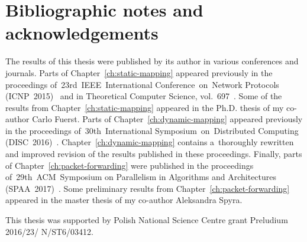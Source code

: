 \section{Bibliographic notes and acknowledgements}

The results of this thesis were published by its author in various conferences and journals.
Parts of Chapter~\ref{ch:static-mapping} appeared previously in the proceedings of~23rd~IEEE~International Conference~on~Network Protocols (ICNP~2015)~\cite{my-icnp}
and in Theoretical Computer Science, vol.~697~\cite{my-tcs}.
Some of the results from Chapter~\ref{ch:static-mapping} appeared in the Ph.D. thesis of my co-author Carlo Fuerst.
Parts of Chapter~\ref{ch:dynamic-mapping} appeared previously in the proceedings of~30th~International Symposium~on~Distributed Computing (DISC~2016)~\cite{my-disc}.
Chapter~\ref{ch:dynamic-mapping} contains a~thoroughly rewritten and improved revision of the results published in these proceedings.
Finally, parts of Chapter~\ref{ch:packet-forwarding} were published in the proceedings of~29th~ACM~Symposium on Parallelism in Algorithms and Architectures (SPAA~2017)~\cite{my-spaa}.
Some preliminary results from Chapter~\ref{ch:packet-forwarding} appeared in the master thesis of my co-author Aleksandra Spyra.

This thesis was supported by Polish National Science Centre grant Preludium 2016/23/ N/ST6/03412.

